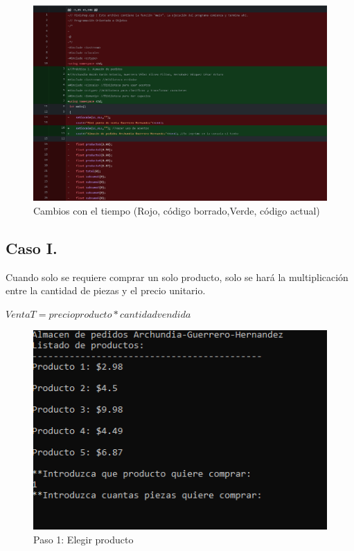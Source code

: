 \documentclass[letter,twocolumn]{revtex4}
\begin{document}
    
    \begin{figure}[ht]
             \renewcommand\figurename{Fig.}
             \includegraphics[scale=0.2]{Images/Captura de pantalla (214).png}
             \caption{Cambios con el tiempo (Rojo, código borrado,Verde, código actual)}
    \end{figure}
\subsection{Caso I.}
Cuando solo se requiere comprar un solo producto, solo se hará la multiplicación entre la cantidad de piezas y el precio unitario.     
\begin{center}
\begin{large}
        $ VentaT =  precioproducto * cantidadvendida $
\end{large}
\end{center}
        
    \begin{figure}[ht]
             \renewcommand\figurename{Fig.}
             \includegraphics[scale=0.5]{Images/Paso1.PNG}
             \caption{Paso 1: Elegir producto}
    \end{figure}
   
\end{document}
